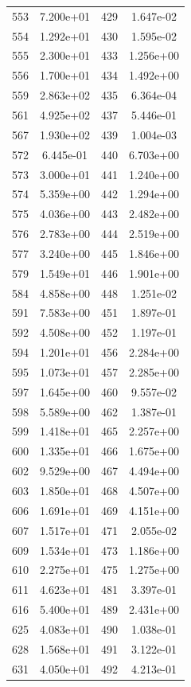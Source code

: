 \documentclass[12pt]{article}
\begin{document}
\begin{longtable}{@{}cccc@{}}
553 & 7.200e+01 & 429 & 1.647e-02 \\
554 & 1.292e+01 & 430 & 1.595e-02 \\
555 & 2.300e+01 & 433 & 1.256e+00 \\
556 & 1.700e+01 & 434 & 1.492e+00 \\
559 & 2.863e+02 & 435 & 6.364e-04 \\
561 & 4.925e+02 & 437 & 5.446e-01 \\
567 & 1.930e+02 & 439 & 1.004e-03 \\
572 & 6.445e-01 & 440 & 6.703e+00 \\
573 & 3.000e+01 & 441 & 1.240e+00 \\
574 & 5.359e+00 & 442 & 1.294e+00 \\
575 & 4.036e+00 & 443 & 2.482e+00 \\
576 & 2.783e+00 & 444 & 2.519e+00 \\
577 & 3.240e+00 & 445 & 1.846e+00 \\
579 & 1.549e+01 & 446 & 1.901e+00 \\
584 & 4.858e+00 & 448 & 1.251e-02 \\
591 & 7.583e+00 & 451 & 1.897e-01 \\
592 & 4.508e+00 & 452 & 1.197e-01 \\
594 & 1.201e+01 & 456 & 2.284e+00 \\
595 & 1.073e+01 & 457 & 2.285e+00 \\
597 & 1.645e+00 & 460 & 9.557e-02 \\
598 & 5.589e+00 & 462 & 1.387e-01 \\
599 & 1.418e+01 & 465 & 2.257e+00 \\
600 & 1.335e+01 & 466 & 1.675e+00 \\
602 & 9.529e+00 & 467 & 4.494e+00 \\
603 & 1.850e+01 & 468 & 4.507e+00 \\
606 & 1.691e+01 & 469 & 4.151e+00 \\
607 & 1.517e+01 & 471 & 2.055e-02 \\
609 & 1.534e+01 & 473 & 1.186e+00 \\
610 & 2.275e+01 & 475 & 1.275e+00 \\
611 & 4.623e+01 & 481 & 3.397e-01 \\
616 & 5.400e+01 & 489 & 2.431e+00 \\
625 & 4.083e+01 & 490 & 1.038e-01 \\
628 & 1.568e+01 & 491 & 3.122e-01 \\
631 & 4.050e+01 & 492 & 4.213e-01 \\

\end{longtable}
\end{document}
